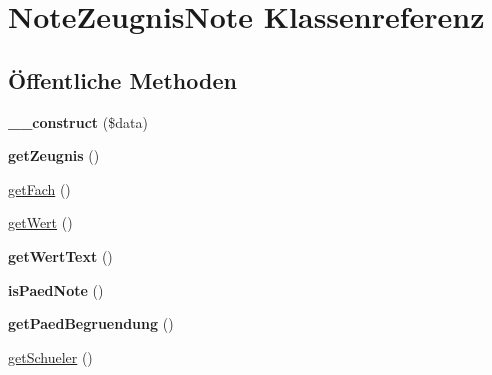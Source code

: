 \hypertarget{class_note_zeugnis_note}{}\section{Note\+Zeugnis\+Note Klassenreferenz}
\label{class_note_zeugnis_note}
\subsection*{Öffentliche Methoden}
\begin{DoxyCompactItemize}
\item 
\mbox{\label{class_note_zeugnis_note_ae4b45aea5a586053b053f926d6d1c497}} 
{\bfseries \+\_\+\+\_\+construct} (\$data)
\item 
\mbox{\label{class_note_zeugnis_note_af0483c88ac0b5656da2c351ccaf5d980}} 
{\bfseries get\+Zeugnis} ()
\item 
\mbox{\hyperlink{class_note_zeugnis_note_a5f11dcc708bb247aeb22fb8e0d2cc390}{get\+Fach}} ()
\item 
\mbox{\hyperlink{class_note_zeugnis_note_aaf307e9d16fd09108b2e8497c3b07f3a}{get\+Wert}} ()
\item 
\mbox{\label{class_note_zeugnis_note_a33bcec8f89c92c67994bd2f0881addce}} 
{\bfseries get\+Wert\+Text} ()
\item 
\mbox{\label{class_note_zeugnis_note_aa5920f067d8baf7019b12db4a6bdb90d}} 
{\bfseries is\+Paed\+Note} ()
\item 
\mbox{\label{class_note_zeugnis_note_afabd46b599f3f035e9d9867b459d3a79}} 
{\bfseries get\+Paed\+Begruendung} ()
\item 
\mbox{\hyperlink{class_note_zeugnis_note_a5cf0587b3c76321ccb06fcde0abb3dc2}{get\+Schueler}} ()
\end{DoxyCompactItemize}

